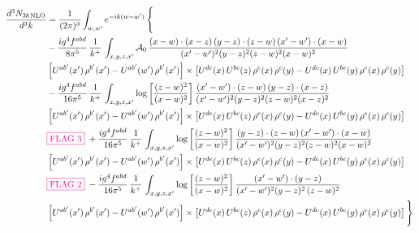 \documentclass[9pt]{article}
\numberwithin{equation}{section}
\begin{document}
\begin{align}
\frac{d^{3}N_{3b\,\rm NLO}}{d^{3}k} & = \frac{1}{(2\pi)^{3}}\int_{w,w'}e^{-ik(w-w')}\,\Bigg\{\notag \\
&-\frac{ig^{4}f^{abd}}{8\pi^{5}}\,\frac{1}{k^{+}}\,\int_{x,y,z,x'}\mathcal{A}_{0}\,
\frac{(x-w)\cdot(x-z)\,(y-z)\cdot(z-w)\,(x'-w')\cdot(x-w)}{(x'-w')^{2}(y-z)^{2}(z-w)^{2}(x-w)^{2}}\notag \\ & \left[U^{ab'}(x')\,\rho^{b'}(x')-U^{ab'}(w')\, \rho^{b'}(x')\right]\times \left[U^{de}(x)\,U^{bc}(z)\, \rho^{e}(x)\,\rho^{c}(y)-U^{de}(x)\,U^{bc}(y)\,\rho^{e}(x)\,\rho^{c}(y)\right] \notag \\
& -\frac{ig^{4}f^{abd}}{16\pi^{5}}\,\frac{1}{k^{+}}\,\int_{x,y,z,x'}\log{\left[\frac{(z-w)^{2}}{(x-w)^{2}}\right]}\,
\frac{(x'-w')\cdot(z-w)\,(y-z)\cdot(x-z)}{(x'-w')^{2}(y-z)^{2}(z-w)^{2}(x-z)^{2}}\notag \\
&\left[U^{ab'}(x')\,\rho^{b'}(x')-U^{ab'}(w')\, \rho^{b'}(x')\right]\times \left[U^{de}(x)\,U^{bc}(z)\, \rho^{e}(x)\,\rho^{c}(y)-U^{de}(x)\,U^{bc}(y)\,\rho^{e}(x)\,\rho^{c}(y)\right] \notag \\
&{\color{magenta}\fbox{FLAG 3}}\;+ \frac{ig^{4}f^{abd}}{16\pi^{5}}\,\frac{1}{k^{+}}\,\int_{x,y,z,x'}\log{\left[\frac{(z-w)^{2}}{(x-w)^{2}}\right]}\,
\frac{(y-z)\cdot(z-w)\,(x'-w')\cdot(x-w)}{(x'-w')^{2}(y-z)^{2}(z-w)^{2}(x-w)^{2}}\notag \\ 
& \left[U^{ab'}(x')\,\rho^{b'}(x')-U^{ab'}(w')\, \rho^{b'}(x')\right]\times \left[U^{de}(x)\,U^{bc}(z)\, \rho^{e}(x)\,\rho^{c}(y)-U^{de}(x)\,U^{bc}(y)\,\rho^{e}(x)\,\rho^{c}(y)\right]\notag \\ &  {\color{magenta}\fbox{FLAG 2}}\;-\frac{ig^{4}f^{abd}}{16\pi^{5}}\,\frac{1}{k^{+}}\,\int_{x,y,z,x'}\log{\left[\frac{(z-w)^{2}}{(x-w)^{2}}\right]}\,\frac{(x'-w')\cdot(y-z)}{(x'-w')^{2}(y-z)^{2}\,(z-w)^{2}}\notag \\ & \left[U^{ab'}(x')\,\rho^{b'}(x')-U^{ab'}(w')\, \rho^{b'}(x')\right]\times \left[U^{de}(x)\,U^{bc}(z)\, \rho^{e}(x)\,\rho^{c}(y)-U^{de}(x)\,U^{bc}(y)\,\rho^{e}(x)\,\rho^{c}(y)\right]\Bigg\}

\end{align}
\end{document}
